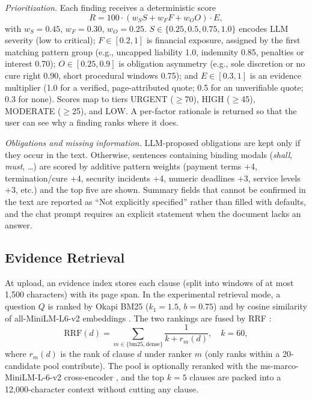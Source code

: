 \documentclass[conference]{IEEEtran}
\begin{document}
\textit{Prioritization.} Each finding receives a deterministic score
\begin{equation}
R=100\cdot\left(w_S S+w_F F+w_O O\right)\cdot E,
\label{eq:risk}
\end{equation}
with $w_S=0.45$, $w_F=0.30$, $w_O=0.25$. $S\in\{0.25,0.5,0.75,1.0\}$ encodes LLM severity (low to critical); $F\in[0.2,1]$ is financial exposure, assigned by the first matching pattern group (e.g., uncapped liability 1.0, indemnity 0.85, penalties or interest 0.70); $O\in[0.25,0.9]$ is obligation asymmetry (e.g., sole discretion or no cure right 0.90, short procedural windows 0.75); and $E\in[0.3,1]$ is an evidence multiplier (1.0 for a verified, page-attributed quote; 0.5 for an unverifiable quote; 0.3 for none). Scores map to tiers URGENT ($\geq$70), HIGH ($\geq$45), MODERATE ($\geq$25), and LOW. A per-factor rationale is returned so that the user can see why a finding ranks where it does.

\textit{Obligations and missing information.} LLM-proposed obligations are kept only if they occur in the text. Otherwise, sentences containing binding modals (\emph{shall}, \emph{must}, \ldots) are scored by additive pattern weights (payment terms +4, termination/cure +4, security incidents +4, numeric deadlines +3, service levels +3, etc.) and the top five are shown. Summary fields that cannot be confirmed in the text are reported as ``Not explicitly specified'' rather than filled with defaults, and the chat prompt requires an explicit statement when the document lacks an answer.

\subsection{Evidence Retrieval}
At upload, an evidence index stores each clause (split into windows of at most 1{,}500 characters) with its page span. In the experimental retrieval mode, a question $Q$ is ranked by Okapi BM25 \cite{robertson2009} ($k_1=1.5$, $b=0.75$) and by cosine similarity of all-MiniLM-L6-v2 embeddings \cite{reimers2019}. The two rankings are fused by RRF \cite{cormack2009}:
\begin{equation}
\mathrm{RRF}(d)=\sum_{m\in\{\mathrm{bm25},\mathrm{dense}\}}\frac{1}{k+r_m(d)},\quad k=60,
\end{equation}
where $r_m(d)$ is the rank of clause $d$ under ranker $m$ (only ranks within a 20-candidate pool contribute). The pool is optionally reranked with the ms-marco-MiniLM-L-6-v2 cross-encoder \cite{nogueira2019}, and the top $k{=}5$ clauses are packed into a 12{,}000-character context without cutting any clause.
\end{document}
